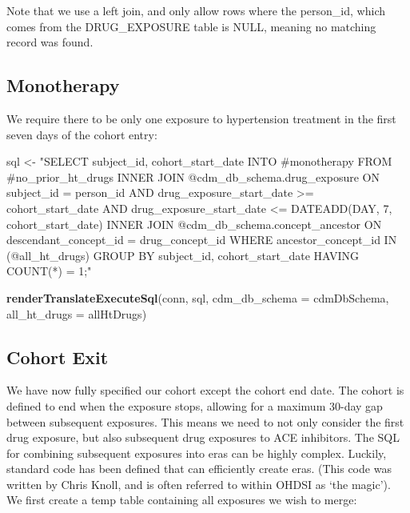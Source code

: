 \documentclass[11pt]{book}
\newenvironment{Shaded}{\begin{snugshade}}{\end{snugshade}}
\newcommand{\KeywordTok}[1]{\textcolor[rgb]{0.13,0.29,0.53}{\textbf{#1}}}
\newcommand{\DataTypeTok}[1]{\textcolor[rgb]{0.13,0.29,0.53}{#1}}
\newcommand{\StringTok}[1]{\textcolor[rgb]{0.31,0.60,0.02}{#1}}
\newcommand{\NormalTok}[1]{#1}
\theoremstyle{definition}
\theoremstyle{definition}
\theoremstyle{definition}
\theoremstyle{remark}
\begin{document}
Note that we use a left join, and only allow rows where the person\_id,
which comes from the DRUG\_EXPOSURE table is NULL, meaning no matching
record was found.

\subsection{Monotherapy}\label{monotherapy}

We require there to be only one exposure to hypertension treatment in
the first seven days of the cohort entry:

\begin{Shaded}
\begin{Highlighting}[]
\NormalTok{sql <-}\StringTok{ "SELECT subject_id,}
\StringTok{  cohort_start_date}
\StringTok{INTO #monotherapy}
\StringTok{FROM #no_prior_ht_drugs}
\StringTok{INNER JOIN @cdm_db_schema.drug_exposure}
\StringTok{  ON subject_id = person_id}
\StringTok{    AND drug_exposure_start_date >= cohort_start_date}
\StringTok{    AND drug_exposure_start_date <= DATEADD(DAY, 7, cohort_start_date)}
\StringTok{INNER JOIN @cdm_db_schema.concept_ancestor}
\StringTok{  ON descendant_concept_id = drug_concept_id}
\StringTok{WHERE ancestor_concept_id IN (@all_ht_drugs)}
\StringTok{GROUP BY subject_id,}
\StringTok{  cohort_start_date}
\StringTok{HAVING COUNT(*) = 1;"}

\KeywordTok{renderTranslateExecuteSql}\NormalTok{(conn, }
\NormalTok{                          sql, }
                          \DataTypeTok{cdm_db_schema =}\NormalTok{ cdmDbSchema, }
                          \DataTypeTok{all_ht_drugs =}\NormalTok{ allHtDrugs)}
\end{Highlighting}
\end{Shaded}

\subsection{Cohort Exit}\label{cohort-exit}

We have now fully specified our cohort except the cohort end date. The
cohort is defined to end when the exposure stops, allowing for a maximum
30-day gap between subsequent exposures. This means we need to not only
consider the first drug exposure, but also subsequent drug exposures to
ACE inhibitors. The SQL for combining subsequent exposures into eras can
be highly complex. Luckily, standard code has been defined that can
efficiently create eras. (This code was written by Chris Knoll, and is
often referred to within OHDSI as `the magic'). We first create a temp
table containing all exposures we wish to merge:
\end{document}

